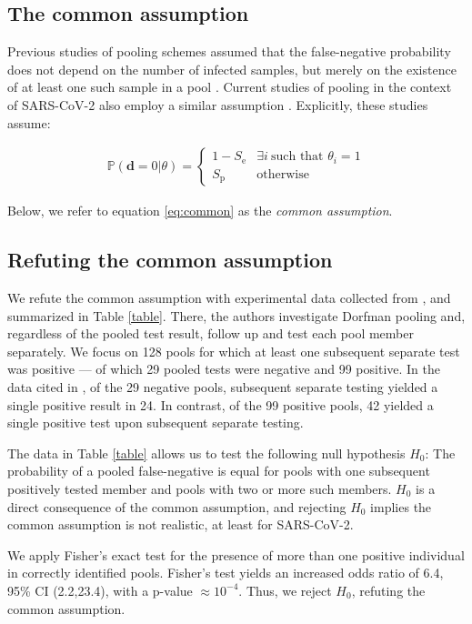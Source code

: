 \documentclass{article}
\renewcommand{\Pr}{\mathbb{P}}
\newcommand{\data}{\mathbf{d}}
\newcommand{\sens}{S_{\text{e}}}
\newcommand{\spec}{S_{\text{p}}}
\begin{document}
\subsection*{The common assumption}\label{subsec:common}
Previous studies of pooling schemes assumed that the false-negative
probability does not depend on the number of infected samples, but
merely on the existence of at least one such sample in a pool
\cite{Kim, OptimalDorfmanPool}. Current studies of pooling in the
context of SARS-CoV-2 also employ a similar assumption
\cite{Simplistic1, Simplistic2}. Explicitly, these studies assume:

\begin{align}\label{eq:common}
  \Pr(\data=0|\theta) = 
  \begin{cases} 
    1-\sens & \exists i\ \text{such that } \theta_i = 1\\
    \spec & \text{otherwise}
  \end{cases} 
\end{align}

Below, we refer to equation \eqref{eq:common} as the \emph{common
  assumption}. 

\subsection*{Refuting the common assumption}\label{subsec:refute}
We refute the common assumption with experimental data collected from
\cite{Salazar}, and summarized in Table \ref{table}. There, the
authors investigate Dorfman pooling and, regardless of the pooled test
result, follow up and test each pool member separately. We focus on
128 pools for which at least one subsequent separate test was positive
--- of which 29 pooled tests were negative and 99 positive. In the
data cited in \cite{Salazar}, of the 29 negative pools, subsequent
separate testing yielded a single positive result in 24. In contrast,
of the 99 positive pools, 42 yielded a single positive test upon
subsequent separate testing.

The data in Table \ref{table} allows us to test the following null
hypothesis $H_0$: The probability of a pooled false-negative is equal
for pools with one subsequent positively tested member and pools with
two or more such members. $H_0$ is a direct consequence of the common
assumption, and rejecting $H_0$ implies the common assumption is not
realistic, at least for SARS-CoV-2.

We apply Fisher's exact test for the presence of more than one
positive individual in correctly identified pools. Fisher's test
yields an increased odds ratio of 6.4, 95\% CI (2.2,23.4), with a
p-value $\approx 10^{-4}$. Thus, we reject $H_0$, refuting the common
assumption.
\end{document}
